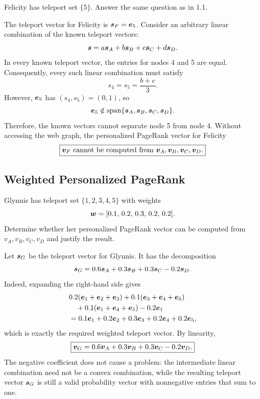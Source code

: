 Felicity has teleport set $\{5\}$. Answer the same question as in 1.1.

\begin{solution}
The teleport vector for Felicity is $\bm{s}_F=\bm{e}_5$. Consider an
arbitrary linear combination of the known teleport vectors:
\[
  \bm{s}=a\bm{s}_A+b\bm{s}_B+c\bm{s}_C+d\bm{s}_D.
\]
In every known teleport vector, the entries for nodes 4 and 5 are equal.
Consequently, every such linear combination must satisfy
\[
  s_4=s_5=\frac{b+c}{3}.
\]
However, $\bm{e}_5$ has $(s_4,s_5)=(0,1)$, so
\[
  \bm{e}_5\notin
  \operatorname{span}\{\bm{s}_A,\bm{s}_B,\bm{s}_C,\bm{s}_D\}.
\]
Therefore, the known vectors cannot separate node 5 from node 4. Without
accessing the web graph, the personalized PageRank vector for Felicity
\[
  \boxed{\bm{v}_F\text{ cannot be computed from }
  \bm{v}_A,\bm{v}_B,\bm{v}_C,\bm{v}_D.}
\]
\end{solution}

\subsection{Weighted Personalized PageRank}

Glynnis has teleport set $\{1,2,3,4,5\}$ with weights
\[
  \bm{w} = [0.1,\,0.2,\,0.3,\,0.2,\,0.2].
\]
Determine whether her personalized PageRank vector can be computed from
$v_A,v_B,v_C,v_D$ and justify the result.

\begin{solution}
Let $\bm{s}_G$ be the teleport vector for Glynnis. It has the decomposition
\[
  \bm{s}_G
  =0.6\bm{s}_A+0.3\bm{s}_B+0.3\bm{s}_C-0.2\bm{s}_D.
\]
Indeed, expanding the right-hand side gives
\begin{align*}
  &0.2(\bm{e}_1+\bm{e}_2+\bm{e}_3)
  +0.1(\bm{e}_3+\bm{e}_4+\bm{e}_5)\\
  &\quad+0.1(\bm{e}_1+\bm{e}_4+\bm{e}_5)
  -0.2\bm{e}_1\\
  &=0.1\bm{e}_1+0.2\bm{e}_2+0.3\bm{e}_3
    +0.2\bm{e}_4+0.2\bm{e}_5,
\end{align*}
which is exactly the required weighted teleport vector. By linearity,
\[
  \boxed{\bm{v}_G
  =0.6\bm{v}_A+0.3\bm{v}_B+0.3\bm{v}_C-0.2\bm{v}_D.}
\]
The negative coefficient does not cause a problem: the intermediate linear
combination need not be a convex combination, while the resulting teleport
vector $\bm{s}_G$ is still a valid probability vector with nonnegative
entries that sum to one.
\end{solution}

